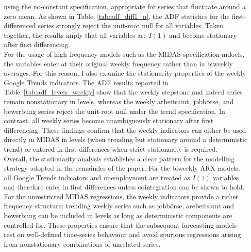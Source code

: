 \documentclass[12pt,a4paper]{article}
\begin{document}
using the no-constant specification, appropriate for series that fluctuate around a 
zero mean. As shown in Table~\ref{tab:adf_diff1_n}, the ADF statistics for the 
first-differenced series strongly reject the unit-root null for all variables.
Taken together, the results imply that all variables are $I(1)$ and become stationary 
after first differencing. \\
For the usage of high frequency models such as the MIDAS specification mdoels, the variables enter at their 
original weekly frequency rather than in biweekly averages. 
For this reason, I also 
examine the stationarity properties of the weekly Google Trends indicators. The ADF 
results reported in Table~\ref{tab:adf_levels_weekly} show that the weekly 
stepstone and indeed series remain nonstationary in levels, whereas the 
weekly arbeitsamt, jobbörse, and bewerbung series reject the 
unit-root null under the trend specification. In contrast, all weekly series become 
unambiguously stationary after first differencing. These findings confirm that the 
weekly indicators can either be used directly in MIDAS in levels (when trending but 
stationary around a deterministic trend) or entered in first differences when strict 
stationarity is required.\\
Overall, the stationarity analysis establishes a clear pattern for the modelling 
strategy adopted in the remainder of the paper. For the biweekly ARX models, all 
Google Trends indicators and unemployment are treated as $I(1)$ variables and 
therefore enter in first differences unless cointegration can be shown to hold. 
For the unrestricted MIDAS regressions, the weekly indicators provide a richer 
frequency structure: trending weekly series such as jobbörse, arebeitsamt and bewerbung can be included in levels as long as deterministic components are 
controlled for.
These properties ensure that the subsequent forecasting models rest on 
well-defined time-series behaviour and avoid spurious regressions arising from 
nonstationary combinations of unrelated series.
\end{document}
